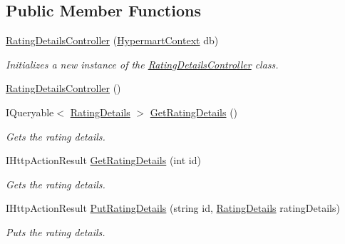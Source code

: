 \subsection*{Public Member Functions}
\begin{DoxyCompactItemize}
\item 
\hyperlink{class_open_1_1_g_i_1_1hypermart_1_1_controllers_1_1_a_p_i_1_1_rating_details_controller_ab75ad1214077861b992f7d3cf7159bd1}{Rating\+Details\+Controller} (\hyperlink{class_open_1_1_g_i_1_1hypermart_1_1_d_a_l_1_1_hypermart_context}{Hypermart\+Context} db)
\begin{DoxyCompactList}\small\item\em Initializes a new instance of the \hyperlink{class_open_1_1_g_i_1_1hypermart_1_1_controllers_1_1_a_p_i_1_1_rating_details_controller}{Rating\+Details\+Controller} class. \end{DoxyCompactList}\item 
\hyperlink{class_open_1_1_g_i_1_1hypermart_1_1_controllers_1_1_a_p_i_1_1_rating_details_controller_ae1d1b41f5c7984058a45aec845afcc97}{Rating\+Details\+Controller} ()
\item 
I\+Queryable$<$ \hyperlink{class_open_1_1_g_i_1_1hypermart_1_1_models_1_1_rating_details}{Rating\+Details} $>$ \hyperlink{class_open_1_1_g_i_1_1hypermart_1_1_controllers_1_1_a_p_i_1_1_rating_details_controller_a557eb976767689358889d1728a16c167}{Get\+Rating\+Details} ()
\begin{DoxyCompactList}\small\item\em Gets the rating details. \end{DoxyCompactList}\item 
I\+Http\+Action\+Result \hyperlink{class_open_1_1_g_i_1_1hypermart_1_1_controllers_1_1_a_p_i_1_1_rating_details_controller_a498b197bc682eea0f658ce9b8f44df0e}{Get\+Rating\+Details} (int id)
\begin{DoxyCompactList}\small\item\em Gets the rating details. \end{DoxyCompactList}\item 
I\+Http\+Action\+Result \hyperlink{class_open_1_1_g_i_1_1hypermart_1_1_controllers_1_1_a_p_i_1_1_rating_details_controller_aeaa95bcc98646b2a84205b111b0d2560}{Put\+Rating\+Details} (string id, \hyperlink{class_open_1_1_g_i_1_1hypermart_1_1_models_1_1_rating_details}{Rating\+Details} rating\+Details)
\begin{DoxyCompactList}\small\item\em Puts the rating details. \end{DoxyCompactList}\item 

\end{DoxyCompactItemize}
